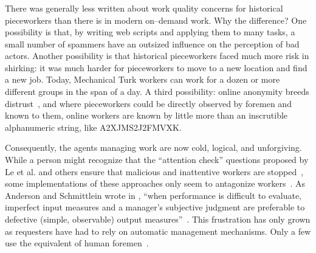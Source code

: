 \documentclass[pn4226]{subfiles}
\begin{document}
\subsubsection{\whatchanged}

\begin{comment}
	*workers make little money but love autonomy --- workers make little money
	workers blamed for quality --- ???
	both cases, sociality is hard
	*collective action hard --- collective action succeeded
	- algorithms, not managers
\end{comment}

There was generally less written about work quality concerns for historical pieceworkers than there is in modern on--demand work. 
Why the difference? 
One possibility is that, by writing web scripts and applying them to many tasks,
a small number of spammers have an outsized influence on the perception of bad actors.
Another possibility is that historical pieceworkers faced much more risk in shirking:
it was much harder for pieceworkers to move to a new location and find a new job.
Today, Mechanical Turk workers can work for a dozen or more different groups in the span of a day.
A third possibility: online anonymity breeds distrust~\cite{friedman2000trust}, and
where pieceworkers could be directly observed by foremen and known to them,
online workers are known by little more than an inscrutible alphanumeric string, like A2XJMS2J2FMVXK.



Consequently,
the agents managing work are now
cold, logical, and unforgiving.
While a person might recognize that the ``attention check'' questions
proposed by Le et al. and others ensure that
malicious and inattentive workers are stopped~\cite{le2010ensuring,AAAIW113995},
some implementations of these approaches
only seem to antagonize workers~\cite{takingAHITMcInnis}.
As Anderson and Schmittlein wrote in \citeyear{10.2307/2555446},
``when performance is difficult to evaluate,
imperfect input measures and
a manager's subjective judgment are preferable to
defective (simple, observable) output measures''~\cite{10.2307/2555446}.
This frustration has only grown as requesters have had to rely on automatic management mechanisms.
Only a few use the equivalent of human foremen~\cite{haas2015argonaut,kulkarni2012mobileworks}.
\end{document}
